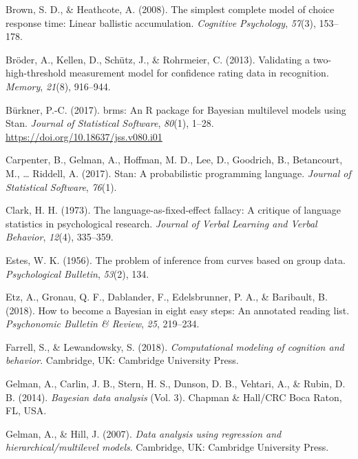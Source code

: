 \documentclass[
  english,
  ,man,floatsintext]{apa6}
\begin{document}
\leavevmode\hypertarget{ref-BrownAndHeathcote2008}{}%
Brown, S. D., \& Heathcote, A. (2008). The simplest complete model of choice response time: Linear ballistic accumulation. \emph{Cognitive Psychology}, \emph{57}(3), 153--178.

\leavevmode\hypertarget{ref-BroderEtAl2013}{}%
Bröder, A., Kellen, D., Schütz, J., \& Rohrmeier, C. (2013). Validating a two-high-threshold measurement model for confidence rating data in recognition. \emph{Memory}, \emph{21}(8), 916--944.

\leavevmode\hypertarget{ref-brms}{}%
Bürkner, P.-C. (2017). brms: An R package for Bayesian multilevel models using Stan. \emph{Journal of Statistical Software}, \emph{80}(1), 1--28. \url{https://doi.org/10.18637/jss.v080.i01}

\leavevmode\hypertarget{ref-carpenter2017stan}{}%
Carpenter, B., Gelman, A., Hoffman, M. D., Lee, D., Goodrich, B., Betancourt, M., \ldots{} Riddell, A. (2017). Stan: A probabilistic programming language. \emph{Journal of Statistical Software}, \emph{76}(1).

\leavevmode\hypertarget{ref-clark1973language}{}%
Clark, H. H. (1973). The language-as-fixed-effect fallacy: A critique of language statistics in psychological research. \emph{Journal of Verbal Learning and Verbal Behavior}, \emph{12}(4), 335--359.

\leavevmode\hypertarget{ref-estes1956problem}{}%
Estes, W. K. (1956). The problem of inference from curves based on group data. \emph{Psychological Bulletin}, \emph{53}(2), 134.

\leavevmode\hypertarget{ref-EtzEtAl2018}{}%
Etz, A., Gronau, Q. F., Dablander, F., Edelsbrunner, P. A., \& Baribault, B. (2018). How to become a Bayesian in eight easy steps: An annotated reading list. \emph{Psychonomic Bulletin \& Review}, \emph{25}, 219--234.

\leavevmode\hypertarget{ref-FarrellAndLewandowsky2018}{}%
Farrell, S., \& Lewandowsky, S. (2018). \emph{Computational modeling of cognition and behavior}. Cambridge, UK: Cambridge University Press.

\leavevmode\hypertarget{ref-GelmanEtAl2014}{}%
Gelman, A., Carlin, J. B., Stern, H. S., Dunson, D. B., Vehtari, A., \& Rubin, D. B. (2014). \emph{Bayesian data analysis} (Vol. 3). Chapman \& Hall/CRC Boca Raton, FL, USA.

\leavevmode\hypertarget{ref-GelmanAndHill2007}{}%
Gelman, A., \& Hill, J. (2007). \emph{Data analysis using regression and hierarchical/multilevel models}. Cambridge, UK: Cambridge University Press.
\end{document}
